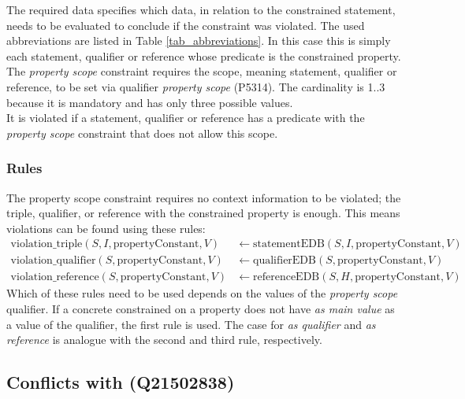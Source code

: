 \documentclass[hyperref,bachelorofscience,fleqn]{cgvpub}
\begin{document}
The required data specifies which data, in relation to the constrained statement, needs to be evaluated to conclude if the constraint was violated. The used abbreviations are listed in Table \ref{tab_abbreviations}. In this case this is simply each statement, qualifier or reference whose predicate is the constrained property.\\
The \emph{property scope} constraint requires the scope, meaning statement, qualifier or reference, to be set via qualifier \emph{property scope} (P5314). The cardinality is 1..3 because it is mandatory and has only three possible values.\\
It is violated if a statement, qualifier or reference has a predicate with the \emph{property scope} constraint that does not allow this scope.\\

\subsubsection{Rules}
The property scope constraint requires no context information to be violated; the triple, qualifier, or reference with the constrained property is enough. This means violations can be found using these rules:
\begin{align*}
\text{violation\_triple}(S, I, \text{propertyConstant}, V) &\leftarrow \text{statementEDB}(S, I, \text{propertyConstant}, V)\\
\text{violation\_qualifier}(S, \text{propertyConstant}, V) &\leftarrow \text{qualifierEDB}(S, \text{propertyConstant}, V)\\
\text{violation\_reference}(S, \text{propertyConstant}, V) &\leftarrow \text{referenceEDB}(S, H, \text{propertyConstant}, V)
\end{align*}
Which of these rules need to be used depends on the values of the \emph{property scope} qualifier. If a concrete constrained on a property does not have \emph{as main value} as a value of the qualifier, the first rule is used. The case for \emph{as qualifier} and \emph{as reference} is analogue with the second and third rule, respectively.

\subsection{Conflicts with (Q21502838)}
\end{document}

